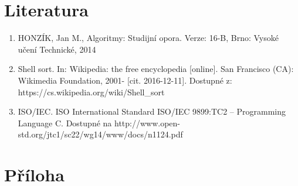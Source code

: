 \documentclass[a4paper, 11pt]{article}
\begin{document}
    \section{Literatura}
    \begin{enumerate}
    \item HONZÍK, Jan M., Algoritmy: Studijní opora. Verze: 16-B, Brno: Vysoké učení Technické, 2014
    \item Shell sort. In: Wikipedia: the free encyclopedia [online]. San Francisco (CA): Wikimedia Foundation, 2001- [cit. 2016-12-11]. Dostupné z: https://cs.wikipedia.org/wiki/Shell\_sort
    \item ISO/IEC. ISO International Standard ISO/IEC 9899:TC2 – Programming Language C. Dostupné na http://www.open-std.org/jtc1/sc22/wg14/www/docs/n1124.pdf


    \end{enumerate}
    \newpage
    \section{Příloha}
\end{document}
